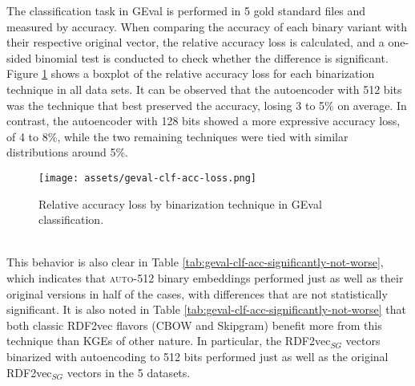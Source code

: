 \documentclass[11pt,titlepage,oneside,openany]{book}
\begin{document}
The classification task in GEval is performed in 5 gold standard files and measured by accuracy. When comparing the accuracy of each binary variant with their respective original vector, the relative accuracy loss is calculated, and a one-sided binomial test is conducted to check whether the difference is significant. Figure \ref{fig:geval-clf-acc-loss} shows a boxplot of the relative accuracy loss for each binarization technique in all data sets. It can be observed that the autoencoder with 512 bits was the technique that best preserved the accuracy, losing 3 to 5\% on average. In contrast, the autoencoder with 128 bits showed a more expressive accuracy loss, of 4 to 8\%, while the two remaining techniques were tied with similar distributions around 5\%.\\
\begin{figure}[h!]
    \centering
    \centerline{\texttt{[image: assets/geval-clf-acc-loss.png]}}
    \vspace*{-3mm}
    \caption{Relative accuracy loss by binarization technique in GEval classification.}
    \label{fig:geval-clf-acc-loss}
\end{figure}
\\
This behavior is also clear in Table \ref{tab:geval-clf-acc-significantly-not-worse}, which indicates that \textsc{auto-512} binary embeddings performed just as well as their original versions in half of the cases, with differences that are not statistically significant. It is also noted in Table \ref{tab:geval-clf-acc-significantly-not-worse} that both classic RDF2vec flavors (CBOW and Skipgram) benefit more from this technique than KGEs of other nature. In particular, the RDF2vec$_{SG}$ vectors binarized with autoencoding to 512 bits performed just as well as the original RDF2vec$_{SG}$ vectors in the 5 datasets. \\
\end{document}

